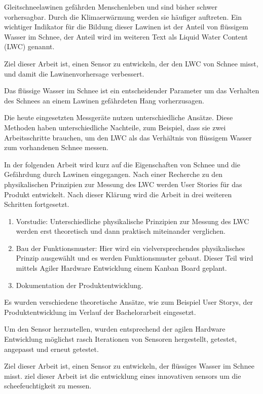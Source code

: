 Gleitschneelawinen gefährden Menschenleben und sind bisher schwer vorhersagbar. Durch die Klimaerwärmung werden sie häufiger auftreten. Ein wichtiger Indikator für die Bildung dieser Lawinen ist der Anteil von flüssigem Wasser im Schnee, der Anteil wird im weiteren Text als Liquid Water Content (LWC) genannt.

Ziel dieser Arbeit ist, einen Sensor zu entwickeln, der den LWC von Schnee misst, und damit die Lawinenvorhersage verbessert.


Das flüssige Wasser im Schnee ist ein entscheidender Parameter um das Verhalten des Schnees an einem Lawinen gefährdeten Hang  vorherzusagen. 

Die heute eingesetzten Messgeräte nutzen unterschiedliche Ansätze. Diese Methoden haben unterschiedliche Nachteile, zum Beispiel, dass sie zwei Arbeitsschritte brauchen, um den LWC als das Verhältnis von flüssigem Wasser zum vorhandenen Schnee  messen. 

In der folgenden Arbeit wird kurz auf die Eigenschaften von Schnee und die Gefährdung durch Lawinen eingegangen. Nach einer Recherche zu den physikalischen Prinzipien zur Messung des LWC werden User Stories für das Produkt entwickelt. Nach dieser Klärung wird die Arbeit in drei weiteren Schritten fortgesetzt.

\begin{enumerate}
\item Vorstudie: Unterschiedliche physikalische Prinzipien zur Messung des LWC werden erst theoretisch und dann praktisch miteinander verglichen.

\item Bau der Funktionsmuster: Hier wird ein vielversprechendes physikalisches Prinzip ausgewählt und es werden Funktionsmuster gebaut. Dieser Teil wird mittels Agiler Hardware Entwicklung einem Kanban Board geplant.

\item Dokumentation der Produktentwicklung.
\end{enumerate}

Es wurden verschiedene theoretische Ansätze, wie zum Beispiel User Storys, der Produktentwicklung im Verlauf der Bachelorarbeit eingesetzt.

Um den Sensor herzustellen, wurden entsprechend der agilen Hardware Entwicklung möglichst rasch Iterationen von Sensoren hergestellt, getestet, angepasst und erneut getestet.


\iffalse


Ziel dieser Arbeit ist, einen Sensor zu entwickeln, der flüssiges Wasser im Schnee misst.
ziel dieser Arbeit ist die entwicklung eines innovativen sensors um die scheefeuchtigkeit zu messen.

